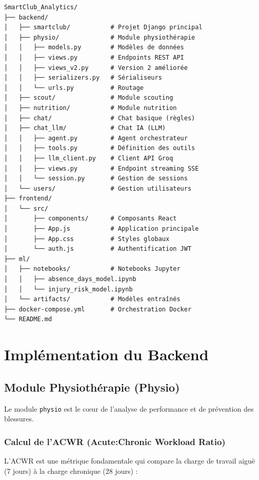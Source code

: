 \begin{lstlisting}[style=codeframe]
SmartClub_Analytics/
├── backend/
│   ├── smartclub/           # Projet Django principal
│   ├── physio/              # Module physiothérapie
│   │   ├── models.py        # Modèles de données
│   │   ├── views.py         # Endpoints REST API
│   │   ├── views_v2.py      # Version 2 améliorée
│   │   ├── serializers.py   # Sérialiseurs
│   │   └── urls.py          # Routage
│   ├── scout/               # Module scouting
│   ├── nutrition/           # Module nutrition
│   ├── chat/                # Chat basique (règles)
│   ├── chat_llm/            # Chat IA (LLM)
│   │   ├── agent.py         # Agent orchestrateur
│   │   ├── tools.py         # Définition des outils
│   │   ├── llm_client.py    # Client API Groq
│   │   ├── views.py         # Endpoint streaming SSE
│   │   └── session.py       # Gestion de sessions
│   └── users/               # Gestion utilisateurs
├── frontend/
│   └── src/
│       ├── components/      # Composants React
│       ├── App.js           # Application principale
│       ├── App.css          # Styles globaux
│       └── auth.js          # Authentification JWT
├── ml/
│   ├── notebooks/           # Notebooks Jupyter
│   │   ├── absence_days_model.ipynb
│   │   └── injury_risk_model.ipynb
│   └── artifacts/           # Modèles entraînés
├── docker-compose.yml       # Orchestration Docker
└── README.md
\end{lstlisting}

\section{Implémentation du Backend}

\subsection{Module Physiothérapie (Physio)}

Le module \texttt{physio} est le cœur de l'analyse de performance et de prévention des blessures.

\subsubsection{Calcul de l'ACWR (Acute:Chronic Workload Ratio)}

L'ACWR est une métrique fondamentale qui compare la charge de travail aiguë (7 jours) à la charge chronique (28 jours) :

